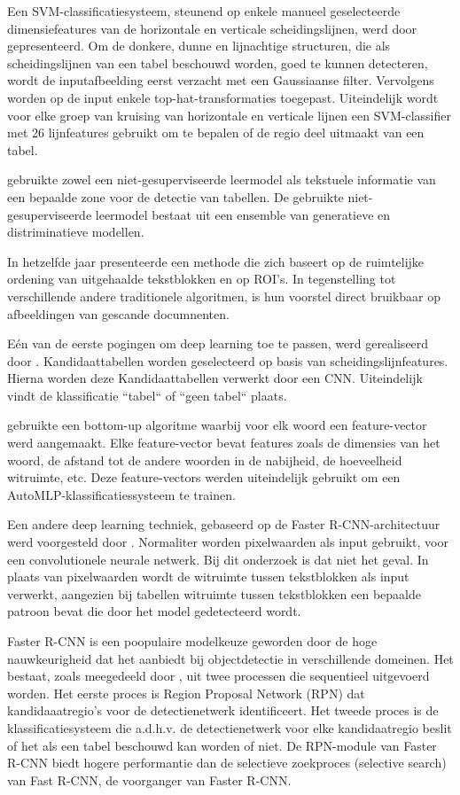 Een SVM-classificatiesysteem, steunend op enkele manueel geselecteerde dimensiefeatures van de horizontale en verticale scheidingslijnen, werd door \textcite{Kasar2013} gepresenteerd. Om de donkere, dunne en lijnachtige structuren, die als scheidingslijnen van een tabel beschouwd worden, goed te kunnen detecteren, wordt de inputafbeelding eerst verzacht met een Gaussiaanse filter. Vervolgens worden op de input enkele top-hat-transformaties toegepast. Uiteindelijk wordt voor elke groep van kruising van horizontale en verticale lijnen een SVM-classifier met 26 lijnfeatures gebruikt om te bepalen of de regio deel uitmaakt van een tabel.

\textcite{Fan2015} gebruikte zowel een niet-gesuperviseerde leermodel als tekstuele informatie van een bepaalde zone voor de detectie van tabellen. De gebruikte niet-gesuperviseerde leermodel bestaat uit een ensemble van generatieve en distriminatieve modellen.

In hetzelfde jaar presenteerde \textcite{Tran2015} een methode die zich baseert op de ruimtelijke ordening van uitgehaalde tekstblokken en op ROI's. In tegenstelling tot verschillende andere traditionele algoritmen, is hun voorstel direct bruikbaar op afbeeldingen van gescande documnenten.

Eén van de eerste pogingen om deep learning toe te passen, werd gerealiseerd door \textcite{Hao2016}. Kandidaattabellen worden geselecteerd op basis van scheidingslijnfeatures. Hierna worden deze Kandidaattabellen verwerkt door een CNN. Uiteindelijk vindt de klassificatie ``tabel`` of ``geen tabel`` plaats.

\textcite{Rashid2017} gebruikte een bottom-up algoritme waarbij voor elk woord een feature-vector werd aangemaakt. Elke feature-vector bevat features zoals de dimensies van het woord, de afstand tot de andere woorden in de nabijheid, de hoeveelheid witruimte, etc. Deze feature-vectors werden uiteindelijk gebruikt om een AutoMLP-klassificatiessysteem te trainen.

Een andere deep learning techniek, gebaseerd op de Faster R-CNN-architectuur werd voorgesteld door \textcite{Gilani2017}. Normaliter worden pixelwaarden als input gebruikt, voor een convolutionele neurale netwerk. Bij dit onderzoek is dat niet het geval. In plaats van pixelwaarden wordt de witruimte tussen tekstblokken als input verwerkt, aangezien bij tabellen witruimte tussen tekstblokken een bepaalde patroon bevat die door het model gedetecteerd wordt.

Faster R-CNN is een poopulaire modelkeuze geworden door de hoge nauwkeurigheid dat het aanbiedt bij objectdetectie in verschillende domeinen. Het bestaat, zoals meegedeeld door \textcite{Shahzad2019}, uit twee processen die sequentieel uitgevoerd worden. Het eerste proces is Region Proposal Network (RPN) dat kandidaaatregio's voor de detectienetwerk identificeert. Het tweede proces is de klassificatiesysteem die a.d.h.v. de detectienetwerk voor elke kandidaatregio beslit of het als een tabel beschouwd kan worden of niet. De RPN-module van Faster R-CNN biedt hogere performantie dan de selectieve zoekproces (selective search) van Fast R-CNN, de voorganger van Faster R-CNN.

